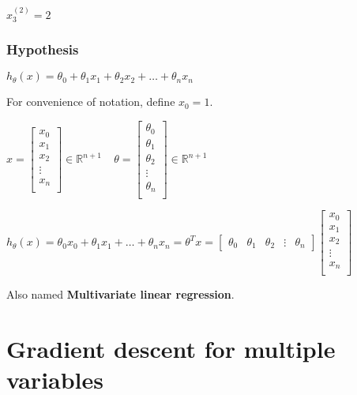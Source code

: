 \documentclass[a4paper]{report}
\begin{document}
      $x^{(2)}_3 = 2$

      \subsubsection{Hypothesis}

        $h_{\theta}(x) = \theta_{0} + \theta_{1}x_{1} + \theta_{2}x_{2} + \ldots + \theta_{n}x_{n}$

        For convenience of notation, define $x_{0} = 1$.

        $x =
        \begin{bmatrix}
          x_{0} \\
          x_{1} \\
          x_{2} \\
          \vdots \\
          x_{n} \\
        \end{bmatrix}
        \in \mathbb{R}^{n+1}
        \ \ \ \ \ 
        \theta = 
        \begin{bmatrix}
          \theta_{0} \\
          \theta_{1} \\
          \theta_{2} \\
          \vdots \\
          \theta_{n} \\
        \end{bmatrix}
        \in \mathbb{R}^{n+1}$

        $h_{\theta}(x) = \theta_{0}x_{0} + \theta_{1}x_{1} + \ldots + \theta_{n}x_{n} = \theta^{T}x =
        \begin{bmatrix}
          \theta_{0} & \theta_{1} & \theta_{2} & \vdots & \theta_{n}
        \end{bmatrix}
        \begin{bmatrix}
          x_{0} \\
          x_{1} \\
          x_{2} \\
          \vdots \\
          x_{n} \\
        \end{bmatrix}$

        Also named \textbf{Multivariate linear regression}.

    \section{Gradient descent for multiple variables}
\end{document}
